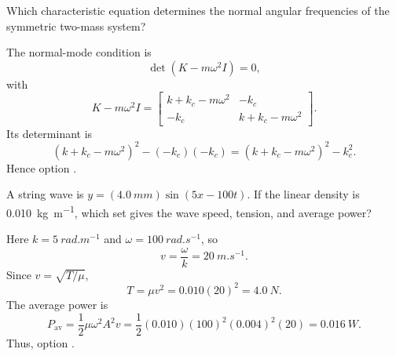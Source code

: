 \begin{quizquestion}[
  id=phy104-nm-030,
  topic=normal-modes,
  difficulty=applied,
  marks=2,
  correct=E,
  tags={coupled-oscillators,characteristic-equation,eigenvalues},
  outcome={Identify the characteristic equation for coupled oscillators}
]
  Which characteristic equation determines the normal angular frequencies of the symmetric two-mass system?
\end{quizquestion}
\begin{quizsolution}
  The normal-mode condition is
    \[
      \det(K-m\omega^2I)=0,
    \]
    with
    \[
      K-m\omega^2I=
      \begin{bmatrix}
        k+k_c-m\omega^2 & -k_c            \\
        -k_c            & k+k_c-m\omega^2
      \end{bmatrix}.
    \]
    Its determinant is
    \[
      {(k+k_c-m\omega^2)}^2-(-k_c)(-k_c)
      ={(k+k_c-m\omega^2)}^2-k_c^2.
    \]
    Hence option \textbf{\quizcorrectletter}.
\end{quizsolution}

\begin{quizquestion}[
  id=phy104-wave-031,
  topic=waves-and-sound,
  difficulty=applied,
  marks=2,
  correct=B,
  tags={travelling-wave,string,tension,power},
  outcome={Relate a wave equation to speed tension and average power}
]
  A string wave is \(y=(\SI{4.0}{mm})\sin(5x-100t)\). If the linear density is \SI{0.010}{kg.m^{-1}}, which set gives the wave speed, tension, and average power?
\end{quizquestion}
\begin{quizsolution}
  Here \(k=\SI{5}{rad.m^{-1}}\) and \(\omega=\SI{100}{rad.s^{-1}}\), so
    \[
      v=\frac{\omega}{k}=\SI{20}{m.s^{-1}}.
    \]
    Since \(v=\sqrt{T/\mu}\),
    \[
      T=\mu v^2=0.010{(20)}^2=\SI{4.0}{N}.
    \]
    The average power is
    \[
      P_{\mathrm{av}}=\frac12\mu\omega^2A^2v
      =\frac12{(0.010)}{(100)}^2{(0.004)}^2{(20)}
      =\SI{0.016}{W}.
    \]
    Thus, option \textbf{\quizcorrectletter}.
\end{quizsolution}


